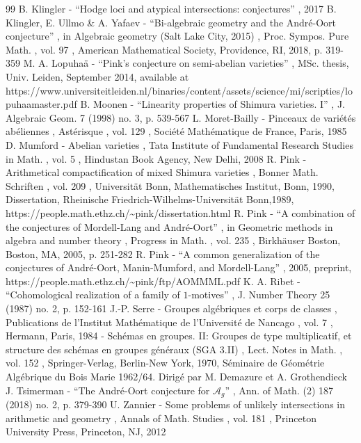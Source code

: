 \documentclass[11pt]{article}
\let\mathcal\mathscr
\let\cal\mathcal
\theoremstyle{plain}
\theoremstyle{definition}
\numberwithin{equation}{subsection}
\begin{document}
\begin{thebibliography}{99}
 B. Klingler - “Hodge loci and atypical intersections: conjectures” , 2017
 B. Klingler, E. Ullmo \& A. Yafaev - “Bi-algebraic geometry and the André-Oort conjecture” , in Algebraic geometry (Salt Lake City, 2015) , Proc. Sympos. Pure Math. , vol. 97 , American Mathematical Society, Providence, RI, 2018, p. 319-359
 M. A. Lopuhaä - “Pink’s conjecture on semi-abelian varieties” , MSc. thesis, Univ. Leiden, September 2014, available at https://www.universiteitleiden.nl/binaries/content/assets/science/mi/scripties/lopuhaamaster.pdf
 B. Moonen - “Linearity properties of Shimura varieties. I” , J. Algebraic Geom. 7 (1998) no. 3, p. 539-567
 L. Moret-Bailly - Pinceaux de variétés abéliennes , Astérisque , vol. 129 , Société Mathématique de France, Paris, 1985
 D. Mumford - Abelian varieties , Tata Institute of Fundamental Research Studies in Math. , vol. 5 , Hindustan Book Agency, New Delhi, 2008
 R. Pink - Arithmetical compactification of mixed Shimura varieties , Bonner Math. Schriften , vol. 209 , Universität Bonn, Mathematisches Institut, Bonn, 1990, Dissertation, Rheinische Friedrich-Wilhelms-Universität Bonn,1989, https://people.math.ethz.ch/\textasciitilde{}pink/dissertation.html
 R. Pink - “A combination of the conjectures of Mordell-Lang and André-Oort” , in Geometric methods in algebra and number theory , Progress in Math. , vol. 235 , Birkhäuser Boston, Boston, MA, 2005, p. 251-282
 R. Pink - “A common generalization of the conjectures of André-Oort, Manin-Mumford, and Mordell-Lang” , 2005, preprint, https://people.math.ethz.ch/\textasciitilde{}pink/ftp/AOMMML.pdf
 K. A. Ribet - “Cohomological realization of a family of $1$-motives” , J. Number Theory 25 (1987) no. 2, p. 152-161
 J.-P. Serre - Groupes algébriques et corps de classes , Publications de l’Institut Mathématique de l’Université de Nancago , vol. 7 , Hermann, Paris, 1984
 - Schémas en groupes. II: Groupes de type multiplicatif, et structure des schémas en groupes généraux (SGA 3.II) , Lect. Notes in Math. , vol. 152 , Springer-Verlag, Berlin-New York, 1970, Séminaire de Géométrie Algébrique du Bois Marie 1962/64. Dirigé par M. Demazure et A. Grothendieck
 J. Tsimerman - “The André-Oort conjecture for $\cal A_g$” , Ann. of Math. (2) 187 (2018) no. 2, p. 379-390
 U. Zannier - Some problems of unlikely intersections in arithmetic and geometry , Annals of Math. Studies , vol. 181 , Princeton University Press, Princeton, NJ, 2012
\end{thebibliography}
\end{document}
